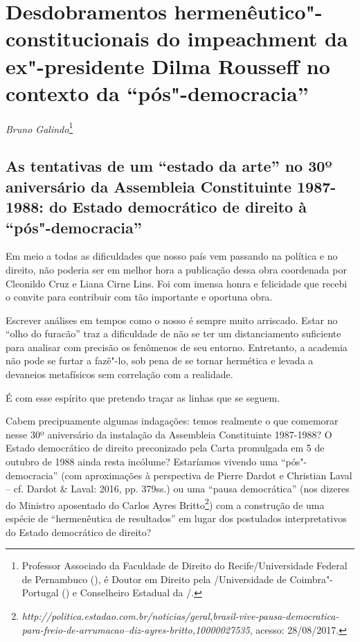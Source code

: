 \chapter{Desdobramentos hermenêutico"-constitucionais do
impeachment da ex"-presidente Dilma Rousseff no contexto da
``pós"-democracia''}

\begin{flushright}
\emph{Bruno Galindo}\footnote{Professor Associado da Faculdade de Direito do Recife/Universidade
Federal de Pernambuco (), é
Doutor em Direito pela /Universidade de Coimbra"-Portugal
() e Conselheiro Estadual da /.}
\end{flushright}


 \section{As tentativas de um ``estado da arte'' no 30º aniversário da
  Assembleia Constituinte 1987-1988: do Estado democrático de direito à
  ``pós"-democracia''}


Em meio a todas as dificuldades que nosso país vem passando na política
e no direito, não poderia ser em melhor hora a publicação dessa obra
coordenada por Cleonildo Cruz e Liana Cirne Lins. Foi com imensa honra e
felicidade que recebi o convite para contribuir com tão importante e
oportuna obra.

Escrever análises em tempos como o nosso é sempre muito arriscado. Estar
no ``olho do furacão'' traz a dificuldade de não se ter um
distanciamento suficiente para analisar com precisão os fenômenos de seu
entorno. Entretanto, a academia não pode se furtar a fazê"-lo, sob pena
de se tornar hermética e levada a devaneios metafísicos sem correlação
com a realidade.

É com esse espírito que pretendo traçar as linhas que se seguem.

Cabem precipuamente algumas indagações: temos realmente o que comemorar
nesse 30º aniversário da instalação da Assembleia Constituinte
1987-1988? O Estado democrático de direito preconizado pela Carta
promulgada em 5 de outubro de 1988 ainda resta incólume? Estaríamos
vivendo uma ``pós"-democracia'' (com aproximações à perspectiva de Pierre
Dardot e Christian Laval -- cf. Dardot \& Laval: 2016, pp. 379ss.) ou
uma ``pausa democrática'' (nos dizeres do Ministro aposentado do 
Carlos Ayres Britto\footnote{\emph{http://politica.estadao.com.br/noticias/geral,brasil-vive-pausa-democratica-para-freio-de-arrumacao--diz-ayres-britto,10000027535},
  acesso: 28/08/2017.}) com a construção de uma espécie de
``hermenêutica de resultados'' em lugar dos postulados interpretativos
do Estado democrático de direito?

